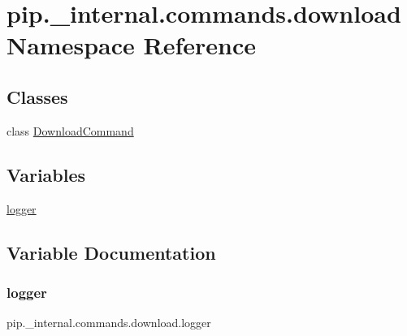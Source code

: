 \hypertarget{namespacepip_1_1__internal_1_1commands_1_1download}{}\section{pip.\+\_\+internal.\+commands.\+download Namespace Reference}
\label{namespacepip_1_1__internal_1_1commands_1_1download}
\subsection*{Classes}
\begin{DoxyCompactItemize}
\item 
class \hyperlink{classpip_1_1__internal_1_1commands_1_1download_1_1DownloadCommand}{Download\+Command}
\end{DoxyCompactItemize}
\subsection*{Variables}
\begin{DoxyCompactItemize}
\item 
\hyperlink{namespacepip_1_1__internal_1_1commands_1_1download_a7d887a2e4890f099d136e9e6e8e4b4e7}{logger}
\end{DoxyCompactItemize}


\subsection{Variable Documentation}
\mbox{\label{namespacepip_1_1__internal_1_1commands_1_1download_a7d887a2e4890f099d136e9e6e8e4b4e7}} 
\subsubsection{\texorpdfstring{logger}{logger}}
{\footnotesize\ttfamily pip.\+\_\+internal.\+commands.\+download.\+logger}

